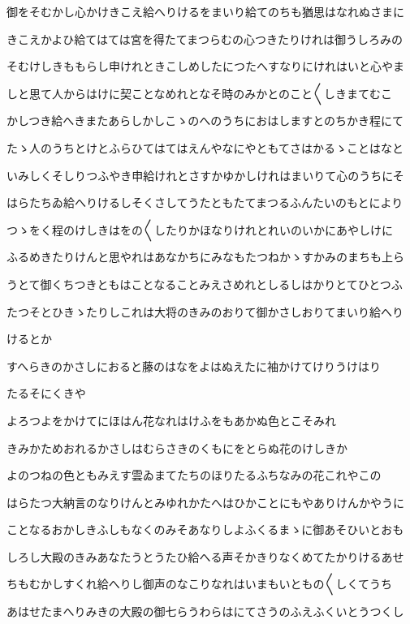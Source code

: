 \documentclass[a4paper,11pt,landscape]{ltjtarticle}
\begin{document}
御をそむかし心かけきこえ給へりけるをまいり給てのちも猶思はなれぬさまに
\par\medskip
きこえかよひ給てはては宮を得たてまつらむの心つきたりけれは御うしろみの
\par\medskip
そむけしきももらし申けれときこしめしたにつたへすなりにけれはいと心やま
\par\medskip
しと思て人からはけに契ことなめれとなそ時のみかとのこと〱しきまてむこ
\par\medskip
かしつき給へきまたあらしかしこゝのへのうちにおはしますとのちかき程にて
\par\medskip
たゝ人のうちとけとふらひてはてはえんやなにやともてさはかるゝことはなと
\par\medskip
いみしくそしりつふやき申給けれとさすかゆかしけれはまいりて心のうちにそ
\par\medskip
はらたちゐ給へりけるしそくさしてうたともたてまつるふんたいのもとにより
\par\medskip
つゝをく程のけしきはをの〱したりかほなりけれとれいのいかにあやしけに
\par\medskip
ふるめきたりけんと思やれはあなかちにみなもたつねかゝすかみのまちも上ら
\par\medskip
うとて御くちつきともはことなることみえさめれとしるしはかりとてひとつふ
\par\medskip
たつそとひきゝたりしこれは大将のきみのおりて御かさしおりてまいり給へり
\par\medskip
けるとか
\par\medskip
すへらきのかさしにおると藤のはなをよはぬえたに袖かけてけりうけはり
\par\medskip
たるそにくきや
\par\medskip
よろつよをかけてにほはん花なれはけふをもあかぬ色とこそみれ
\par\medskip
きみかためおれるかさしはむらさきのくもにをとらぬ花のけしきか
\par\medskip
よのつねの色ともみえす雲ゐまてたちのほりたるふちなみの花これやこの
\par\medskip
はらたつ大納言のなりけんとみゆれかたへはひかことにもやありけんかやうに
\par\medskip
ことなるおかしきふしもなくのみそあなりしよふくるまゝに御あそひいとおも
\par\medskip
しろし大殿のきみあなたうとうたひ給へる声そかきりなくめてたかりけるあせ
\par\medskip
ちもむかしすくれ給へりし御声のなこりなれはいまもいともの〱しくてうち
\par\medskip
あはせたまへりみきの大殿の御七らうわらはにてさうのふえふくいとうつくし
\end{document}
